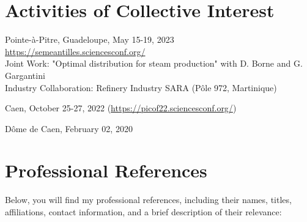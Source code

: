 \documentclass[10pt]{article} %
\begin{document}
\section{Activities of Collective Interest}

{Pointe-à-Pitre, Guadeloupe, May 15-19, 2023 \\
	\href{https://semeantilles.sciencesconf.org/}{https://semeantilles.sciencesconf.org/}\\
	Joint Work: "Optimal distribution for steam production" with D. Borne and G. Gargantini\\
	Industry Collaboration: Refinery Industry SARA (Pôle 972, Martinique)}


{Caen, October 25-27, 2022 (\href{https://picof22.sciencesconf.org/}{https://picof22.sciencesconf.org/})}

{Dôme de Caen, February 02, 2020}

\newpage
\section{Professional References}

Below, you will find my professional references, including their names, titles, affiliations, contact information, and a brief description of their relevance:
\end{document}
